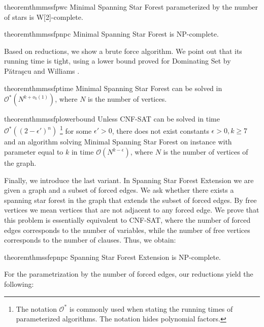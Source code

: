 \documentclass[en]{pracamgr}
\theoremstyle{definition}
\newcommand{\mssfp}{{\sc Minimal Spanning Star Forest}}
\newcommand{\ssfep}{{\sc Spanning Star Forest Extension}}
\newcommand{\domsetp}{{\sc Dominating Set}}
\newcommand{\cnfsat}{{\sc CNF-SAT}}
\begin{document}
\begin{restatable}{theorem}{thmmssfpwc}\label{thm-mssfp-w2c}
	\mssfp{} parameterized by the number of stars is \textup{W[2]}-complete.
\end{restatable}

\begin{restatable}{theorem}{thmmssfpnpc}\label{thm-mssfp-npc}
	\mssfp{} is \textup{NP-complete}.
\end{restatable}

\noindent
Based on reductions, we show a brute force algorithm. We point out that its running time is tight, using a lower bound proved for \domsetp{} by Pătraşcu and Williams \cite{DomSet}. 

\begin{restatable}{theorem}{thmmssfptime}\label{thm-mssfp-time}
	\mssfp{} can be solved in $\mathcal{O}^*(N^{k + o_k(1)})$, where $N$ is the number of vertices.
\end{restatable}

\begin{restatable}{theorem}{thmmssfplowerbound}\label{thm-mssfp-lowerbound}
	Unless \cnfsat{} can be solved in time $\mathcal{O}^*((2-\epsilon')^n)$
	\footnote{The notation $\mathcal{O}^*$ is commonly used when stating the running times of parameterized algorithms. The notation hides polynomial factors.}
	 for some $\epsilon' > 0$, there does not exist constants $\epsilon > 0,k\geq 7$ and an algorithm solving \mssfp{} on instance with parameter equal to $k$ in time $\mathcal{O}(N^{k-\epsilon})$, where $N$ is the number of vertices of the graph.
\end{restatable}

Finally, we introduce the last variant. In \ssfep{} we are given a graph and a subset of forced edges. We ask whether there exists a spanning star forest in the graph that extends the subset of forced edges. By free vertices we mean vertices that are not adjacent to any forced edge. We prove that this problem is essentially equivalent to \cnfsat{}, where the number of forced edges corresponds to the number of variables, while the number of free vertices corresponds to the number of clauses. Thus, we obtain:

\begin{restatable}{theorem}{thmssfepnpc}\label{thm-ssfep-npc}
	\ssfep{} is \textup{NP}-complete.
\end{restatable}

\noindent
For the parametrization by the number of forced edges, our reductions yield the following:
\end{document}
